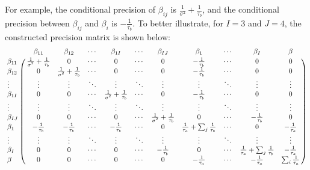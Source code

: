 \documentclass[]{article}
\begin{document}
For example, the conditional precision of \(\beta_{ij}\) is
\(\frac{1}{\sigma^2} + \frac{1}{\tau_b}\), and the conditional precision
between \(\beta_{ij}\) and \(\beta_i\) is \(- \frac{1}{\tau_b}\). To
better illustrate, for \(I=3\) and \(J=4\), the constructed precision
matrix is shown below: \newline \newline
\[
\bordermatrix{
  ~       & \text{$\beta_{11}$} & \text{$\beta_{12}$} & \text{$\cdots$} & \text{$\beta_{1I}$} & \text{$\cdots$} & \text{$\beta_{IJ}$} & \text{$\beta_{1}$} & \text{$\cdots$} & \text{$\beta_{I}$} & \text{$\beta$} \cr
  \text{$\beta_{11}$}   & \frac{1}{\text{$\sigma^2$}} + \frac{1}{\text{$\tau_b$}} & 0 & \text{$\cdots$} & 0 & \text{$\cdots$} & 0 & -\frac{1}{\text{$\tau_b$}} & \text{$\cdots$} & 0 & 0 \cr
  \text{$\beta_{12}$}   & 0 & \frac{1}{\text{$\sigma^2$}} + \frac{1}{\text{$\tau_b$}} & \text{$\cdots$} & 0 & \text{$\cdots$} & 0 & -\frac{1}{\text{$\tau_b$}} & \text{$\cdots$} & 0 & 0 \cr
  \text{$\vdots$}   & \text{$\vdots$}   & \text{$\vdots$} & \text{$\ddots$} & \text{$\vdots$} & \text{$\ddots$} & \text{$\vdots$} & \text{$\vdots$} & \text{$\ddots$} & \text{$\vdots$} & \text{$\vdots$}  \cr
  \text{$\beta_{1I}$}   & 0 & 0 & \text{$\cdots$} & \frac{1}{\text{$\sigma^2$}} + \frac{1}{\text{$\tau_b$}} & \text{$\cdots$} & 0 & -\frac{1}{\text{$\tau_b$}} & \text{$\cdots$} & 0 & 0 \cr
  \text{$\vdots$}   & \text{$\vdots$}   & \text{$\vdots$} & \text{$\ddots$} & \text{$\vdots$} & \text{$\ddots$} & \text{$\vdots$} & \text{$\vdots$} & \text{$\ddots$} & \text{$\vdots$} & \text{$\vdots$}  \cr
  \text{$\beta_{IJ}$} & 0 & 0 & \text{$\cdots$} & 0 & \text{$\cdots$} & \frac{1}{\text{$\sigma^2$}} + \frac{1}{\text{$\tau_b$}} & 0 & \text{$\cdots$} & -\frac{1}{\text{$\tau_b$}} & 0 \cr
  \text{$\beta_{1}$} & -\frac{1}{\text{$\tau_b$}} & -\frac{1}{\text{$\tau_b$}} & \text{$\cdots$} & -\frac{1}{\text{$\tau_b$}} & \text{$\cdots$} & 0 & \frac{1}{\tau_a} + \sum_{j} \frac{1}{\tau_b} & \text{$\cdots$} & 0 & -\frac{1}{\text{$\tau_a$}} \cr
  \text{$\vdots$}   & \text{$\vdots$}   & \text{$\vdots$} & \text{$\ddots$} & \text{$\vdots$} & \text{$\ddots$} & \text{$\vdots$} & \text{$\vdots$} & \text{$\ddots$} & \text{$\vdots$} & \text{$\vdots$}  \cr
  \text{$\beta_{I}$}  & 0 & 0 & \text{$\cdots$} & 0 & \text{$\cdots$} & -\frac{1}{\text{$\tau_b$}} & 0 & \text{$\cdots$} & \frac{1}{\tau_a} + \sum_{j} \frac{1}{\tau_b} & -\frac{1}{\text{$\tau_a$}} \cr
  \text{$\beta$} & 0 & 0 & \text{$\cdots$} & 0 & \text{$\cdots$} & 0 & -\frac{1}{\text{$\tau_a$}} & \text{$\cdots$} & -\frac{1}{\text{$\tau_a$}}  & \sum_i \frac{1}{\tau_a} \cr
}
\]
\end{document}
